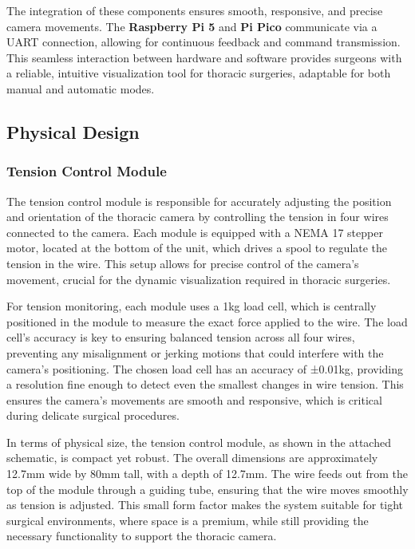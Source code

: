 The integration of these components ensures smooth, responsive, and precise camera movements. The \textbf{Raspberry Pi 5} and \textbf{Pi Pico} communicate via a UART connection, allowing for continuous feedback and command transmission. This seamless interaction between hardware and software provides surgeons with a reliable, intuitive visualization tool for thoracic surgeries, adaptable for both manual and automatic modes.




\subsection{Physical Design}
\subsubsection{Tension Control Module}
The tension control module is responsible for accurately adjusting the position and orientation of the thoracic camera by controlling the tension in four wires connected to the camera. Each module is equipped with a NEMA 17 stepper motor, located at the bottom of the unit, which drives a spool to regulate the tension in the wire. This setup allows for precise control of the camera's movement, crucial for the dynamic visualization required in thoracic surgeries.

For tension monitoring, each module uses a 1kg load cell, which is centrally positioned in the module to measure the exact force applied to the wire. The load cell’s accuracy is key to ensuring balanced tension across all four wires, preventing any misalignment or jerking motions that could interfere with the camera’s positioning. The chosen load cell has an accuracy of ±0.01kg, providing a resolution fine enough to detect even the smallest changes in wire tension. This ensures the camera’s movements are smooth and responsive, which is critical during delicate surgical procedures. 

In terms of physical size, the tension control module, as shown in the attached schematic, is compact yet robust. The overall dimensions are approximately 12.7mm wide by 80mm tall, with a depth of 12.7mm. The wire feeds out from the top of the module through a guiding tube, ensuring that the wire moves smoothly as tension is adjusted. This small form factor makes the system suitable for tight surgical environments, where space is a premium, while still providing the necessary functionality to support the thoracic camera.

